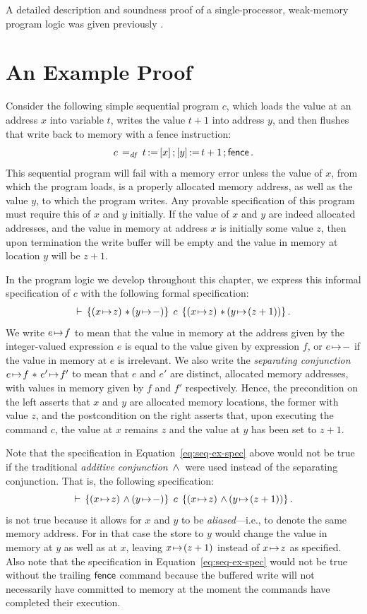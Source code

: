 \documentclass[11pt]{report}
\begin{document}
A detailed description and soundness proof of a single-processor, weak-memory program logic was given previously \cite{wmsldetails}. 

\section{An Example Proof}

Consider the following simple sequential program $c$, which loads the value at an address $x$ into variable $t$, writes the value $t+1$ into address $y$, and then flushes that write back to memory with a fence instruction: \[ c \operatorname{\;=_{\mathit{df}}\;} t \operatorname{:\!=} \left[ x \right] \operatorname{;} \left[ y \right] \operatorname{:\!=} t+1 \operatorname{;} \operatorname{\mathsf{fence}}.\] This sequential program will fail with a memory error unless the value of $x$, from which the program loads, is a properly allocated memory address, as well as the value $y$, to which the program writes. Any provable specification of this program must require this of $x$ and $y$ initially. If the value of $x$ and $y$ are indeed allocated addresses, and the value in memory at address $x$ is initially some value $z$, then upon termination the write buffer will be empty and the value in memory at location $y$ will be $z+1$. 

In the program logic we develop throughout this chapter, we express this informal specification of $c$ with the following formal specification: \begin{align}\label{eq:seq-ex-spec} \triple{(x \fpointsto z) \fsep (y \fpointsto -)}{c}{(x \fpointsto z) \fsep (y \fpointsto (z + 1))}.\end{align}
We write $e \!\mapsto\! f$ to mean that the value in memory at the address given by the integer-valued expression $e$ is equal to the value given by expression $f$, or $e \!\mapsto\! -$ if the value in memory at $e$ is irrelevant. We also write the \emph{separating conjunction} $e \!\mapsto\! f \operatorname{\,\ast\,} e' \!\mapsto\! f'$ to mean that $e$ and $e'$ are distinct, allocated memory addresses, with values in memory given by $f$ and $f'$ respectively. Hence, the precondition on the left asserts that $x$ and $y$ are allocated memory locations, the former with value $z$, and the postcondition on the right asserts that, upon executing the command $c$, the value at $x$ remains $z$ and the value at $y$ has been set to $z+1$. 

Note that the specification in Equation~\ref{eq:seq-ex-spec} above would not be true if the traditional \emph{additive conjunction} $\operatorname{\,\wedge\,}$ were used instead of the separating conjunction. That is, the following specification: \[ \triple{(x \fpointsto z) \conj (y \fpointsto -)}{c}{(x \fpointsto z) \conj (y \fpointsto (z + 1))}.\] is not true because it allows for $x$ and $y$ to be \emph{aliased}---i.e., to denote the same memory address. For in that case the store to $y$ would change the value in memory at $y$ as well as at $x$, leaving $x \!\mapsto\! (z+1)$ instead of $x \!\mapsto\! z$ as specified. Also note that the specification in Equation~\ref{eq:seq-ex-spec} would not be true without the trailing $\operatorname{\mathsf{fence}}$ command because the buffered write will not necessarily have committed to memory at the moment the commands have completed their execution. 
\end{document}
